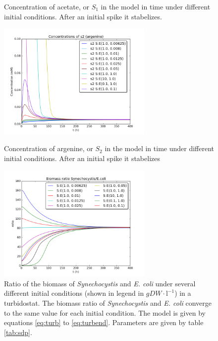 \documentclass[12pt]{report}
\begin{document}
\begin{figure}[htbp]
\begin{minipage}{.45\textwidth}
\begin{center}
     \caption{Concentration of acetate, or $S_1$ in the model in time under different initial conditions. After an initial spike it stabelizes.}
    \label{fig:s1}
   \end{center}
  \end{minipage}
    \hfill
  \begin{minipage}{.45\textwidth}
   \begin{center}
         \includegraphics[width=7.5cm]{S2.png}
     \caption{Concentration of argenine, or $S_2$ in the model in time under different initial conditions. After an initial spike it stabelizes}
    \label{fig:s2}
   \end{center}
  \end{minipage}
    \hfill
  \begin{minipage}{.45\textwidth}
   \begin{center}
     \includegraphics[width=7.5cm]{sub_dependent_turbidostat_bratio.png}
     \caption{Ratio of the biomass of \textit{Synechocystis} and \textit{E. coli} under several different initial conditions (shown in legend in $gDW\cdot \text{l}^{-1}$) in a turbidostat. The biomass ratio of \textit{Synechocystis} and \textit{E. coli} converge to the same value for each initial condition. The model is given by equations \ref{eq:turb} to \ref{eq:turbend}. Parameters are given by table \ref{tab:sdp}.}
     \label{fig:subratturb}
   \end{center}
  \end{minipage}

\end{figure}
\end{document}
